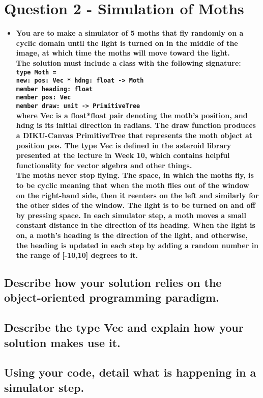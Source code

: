 \documentclass[a4paper,12pt]{article}
\begin{document}
\section{Question 2 - Simulation of Moths}
\begin{itemize}
    \item[] \textbf{You are to make a simulator of 5 moths that fly randomly on a cyclic domain until the light is turned on in the middle of the image, at which time the moths will move toward the light.\\
The solution must include a class with the following signature:\\
\lstinline{type Moth =}\\
\lstinline{new: pos: Vec * hdng: float -> Moth}\\
\lstinline{member heading: float}\\
\lstinline{member pos: Vec}\\
\lstinline{member draw: unit -> PrimitiveTree}\\
where Vec is a float*float pair denoting the moth's position, and hdng is its initial direction in radians. The draw function produces a DIKU-Canvas PrimitiveTree that represents the moth object at position pos. The type Vec is defined in the asteroid library presented at the lecture in Week 10, which contains helpful functionality for vector algebra and other things.\\
The moths never stop flying. The space, in which the moths fly, is to be cyclic meaning that when the moth flies out of the window on the right-hand side, then it reenters on the left and similarly for the other sides of the window. The light is to be turned on and off by pressing space. In each simulator step, a moth moves a small constant distance in the direction of its heading. When the light is on, a moth's heading is the direction of the light, and otherwise, the heading is updated in each step by adding a random number in the range of [-10,10] degrees to it.}
\end{itemize}

\subsection{Describe how your solution relies on the object-oriented programming paradigm.}

\subsection{Describe the type Vec and explain how your solution makes use it.}

\subsection{Using your code, detail what is happening in a simulator step. }
\end{document}
